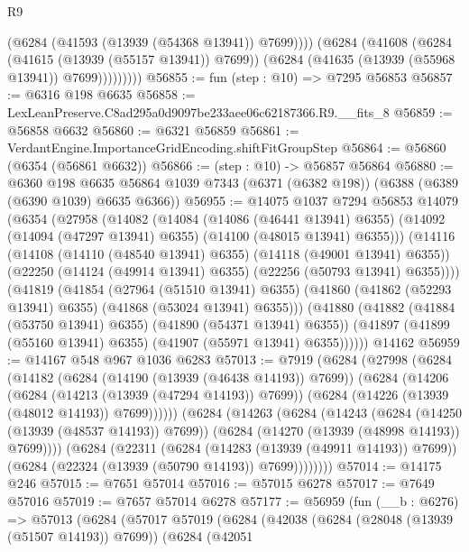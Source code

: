 \begin{lexlean}{R9}
\begin{coremodule}
                  (@6284 (@41593 (@13939 (@54368 @13941)) @7699))))
              (@6284
                (@41608
                  (@6284 (@41615 (@13939 (@55157 @13941)) @7699))
                  (@6284 (@41635 (@13939 (@55968 @13941)) @7699)))))))))
@56855 := fun (step : @10) => @7295 @56853
@56857 := @6316 @198 @6635
@56858 := LexLeanPreserve.C8ad295a0d9097be233aee06c62187366.R9.__fits_8
@56859 := @56858 @6632
@56860 := @6321 @56859
@56861 := VerdantEngine.ImportanceGridEncoding.shiftFitGroupStep
@56864 := @56860 (@6354 (@56861 @6632))
@56866 := (step : @10) -> @56857 @56864
@56880 := @6360
    @198
    @6635
    @56864
    @1039
    @7343
    (@6371 (@6382 @198))
    (@6388 (@6389 (@6390 @1039) @6635 @6366))
@56955 := @14075
    @1037
    @7294
    @56853
    @14079
    (@6354
      (@27958
        (@14082
          (@14084
            (@14086 (@46441 @13941) @6355)
            (@14092 (@14094 (@47297 @13941) @6355) (@14100 (@48015 @13941) @6355)))
          (@14116
            (@14108 (@14110 (@48540 @13941) @6355) (@14118 (@49001 @13941) @6355))
            (@22250 (@14124 (@49914 @13941) @6355) (@22256 (@50793 @13941) @6355))))
        (@41819
          (@41854
            (@27964 (@51510 @13941) @6355)
            (@41860 (@41862 (@52293 @13941) @6355) (@41868 (@53024 @13941) @6355)))
          (@41880
            (@41882 (@41884 (@53750 @13941) @6355) (@41890 (@54371 @13941) @6355))
            (@41897 (@41899 (@55160 @13941) @6355) (@41907 (@55971 @13941) @6355))))))
    @14162
@56959 := @14167 @548 @967 @1036 @6283
@57013 := @7919
    (@6284
      (@27998
        (@6284
          (@14182
            (@6284 (@14190 (@13939 (@46438 @14193)) @7699))
            (@6284
              (@14206
                (@6284 (@14213 (@13939 (@47294 @14193)) @7699))
                (@6284 (@14226 (@13939 (@48012 @14193)) @7699))))))
        (@6284
          (@14263
            (@6284
              (@14243
                (@6284 (@14250 (@13939 (@48537 @14193)) @7699))
                (@6284 (@14270 (@13939 (@48998 @14193)) @7699))))
            (@6284
              (@22311
                (@6284 (@14283 (@13939 (@49911 @14193)) @7699))
                (@6284 (@22324 (@13939 (@50790 @14193)) @7699))))))))
@57014 := @14175 @246
@57015 := @7651 @57014
@57016 := @57015 @6278
@57017 := @7649 @57016
@57019 := @7657 @57014 @6278
@57177 := @56959
    (fun (__b : @6276) =>
    @57013
      (@6284
        (@57017
          @57019
          (@6284
            (@42038
              (@6284 (@28048 (@13939 (@51507 @14193)) @7699))
              (@6284
                (@42051

\end{coremodule}
\end{lexlean}
